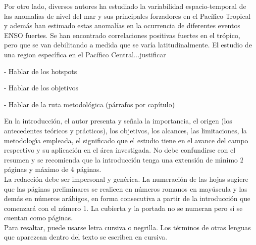Por otro lado, diversos autores ha estudiado la variabilidad espacio-temporal de las anomal\'{i}as de nivel del mar y sus principales forzadores en el Pac\'{i}fico Tropical y además han estimado estas anomal\'{i}as en la ocurrencia de diferentes eventos ENSO fuertes. Se han encontrado correlaciones positivas fuertes en el tr\'{o}pico, pero que se van debilitando a medida que se var\'{i}a latitudinalmente. El estudio de una region específica en el Pacífico Central...justificar

- Hablar de los hotspots

- Hablar de los objetivos

- Hablar de la ruta metodol\'{o}gica  (párrafos por capítulo)

\newpage

En la introducci\'{o}n, el autor presenta y se\~{n}ala la importancia, el origen (los antecedentes te\'{o}ricos y pr\'{a}cticos), los objetivos, los alcances, las limitaciones, la metodolog\'{\i}a empleada, el significado que el estudio tiene en el avance del campo respectivo y su aplicaci\'{o}n en el \'{a}rea investigada. No debe confundirse con el resumen y se recomienda que la introducci\'{o}n tenga una extensi\'{o}n de m\'{\i}nimo 2 p\'{a}ginas y m\'{a}ximo de 4 p\'{a}ginas.\\


La redacci\'{o}n debe ser impersonal y gen\'{e}rica. La numeraci\'{o}n de las hojas sugiere que las p\'{a}ginas preliminares se realicen en n\'{u}meros romanos en may\'{u}scula y las dem\'{a}s en n\'{u}meros ar\'{a}bigos, en forma consecutiva a partir de la introducci\'{o}n que comenzar\'{a} con el n\'{u}mero 1. La cubierta y la portada no se numeran pero si se cuentan como p\'{a}ginas.\\

Para resaltar, puede usarse letra cursiva o negrilla. Los t\'{e}rminos de otras lenguas que aparezcan dentro del texto se escriben en cursiva.\\